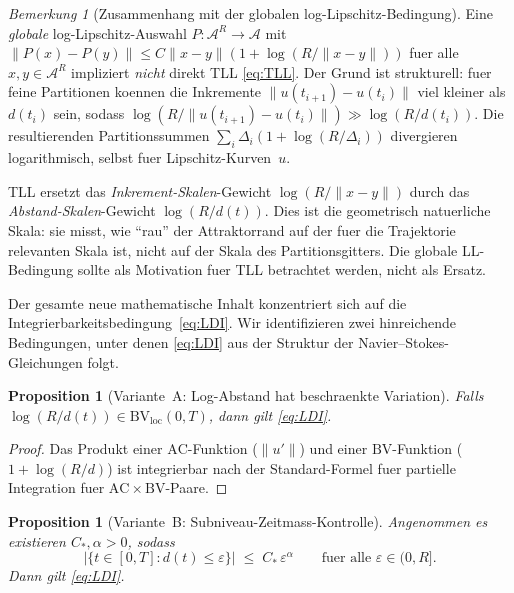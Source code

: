 \documentclass[12pt,a4paper]{article}
\theoremstyle{definition}
\theoremstyle{plain}
\newtheorem{proposition}[definition]{Proposition}
\theoremstyle{remark}
\newtheorem{remark}[definition]{Bemerkung}
\begin{document}
\begin{remark}[Zusammenhang mit der globalen log-Lipschitz-Bedingung]
\label{rem:global-LL}
Eine \emph{globale} log-Lipschitz-Auswahl
$P : \mathcal{A}^R \to \mathcal{A}$ mit
$\|P(x)-P(y)\| \le C\|x-y\|(1+\log(R/\|x-y\|))$
fuer alle $x,y \in \mathcal{A}^R$ impliziert \emph{nicht} direkt TLL
\eqref{eq:TLL}. Der Grund ist strukturell: fuer feine Partitionen
koennen die Inkremente $\|u(t_{i+1})-u(t_i)\|$ viel kleiner als
$d(t_i)$ sein, sodass $\log(R/\|u(t_{i+1})-u(t_i)\|) \gg \log(R/d(t_i))$.
Die resultierenden Partitionssummen
$\sum_i \Delta_i(1+\log(R/\Delta_i))$ divergieren logarithmisch,
selbst fuer Lipschitz-Kurven~$u$.

TLL ersetzt das \emph{Inkrement-Skalen}-Gewicht
$\log(R/\|x-y\|)$ durch das \emph{Abstand-Skalen}-Gewicht
$\log(R/d(t))$. Dies ist die geometrisch natuerliche Skala: sie misst,
wie ``rau'' der Attraktorrand auf der fuer die Trajektorie relevanten Skala ist,
nicht auf der Skala des Partitionsgitters.
Die globale LL-Bedingung sollte als Motivation fuer TLL betrachtet werden,
nicht als Ersatz.
\end{remark}

Der gesamte neue mathematische Inhalt konzentriert sich auf die
Integrierbarkeitsbedingung~\eqref{eq:LDI}. Wir identifizieren zwei
hinreichende Bedingungen, unter denen \eqref{eq:LDI} aus der
Struktur der Navier--Stokes-Gleichungen folgt.

\begin{proposition}[Variante~A: Log-Abstand hat beschraenkte Variation]
\label{prop:LDI-A}
Falls $\log(R/d(t)) \in \mathrm{BV}_{\mathrm{loc}}(0,T)$, dann
gilt \eqref{eq:LDI}.
\end{proposition}

\begin{proof}
Das Produkt einer $\mathrm{AC}$-Funktion ($\|u'\|$) und einer $\mathrm{BV}$-Funktion ($1 + \log(R/d)$) ist integrierbar nach der Standard-Formel
fuer partielle Integration fuer $\mathrm{AC}\times\mathrm{BV}$-Paare.
\end{proof}

\begin{proposition}[Variante~B: Subniveau-Zeitmass-Kontrolle]
\label{prop:LDI-B}
Angenommen es existieren $C_*, \alpha > 0$, sodass
\begin{equation}\label{eq:STC}
  \bigl|\{t \in [0,T] : d(t) \le \varepsilon\}\bigr|
  \;\le\;
  C_*\,\varepsilon^\alpha
  \qquad \text{fuer alle } \varepsilon \in (0, R].
  \tag{STC}
\end{equation}
Dann gilt \eqref{eq:LDI}.
\end{proposition}
\end{document}
